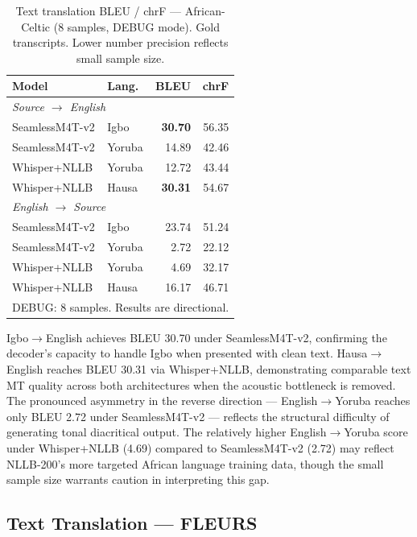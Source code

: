 \documentclass[10pt,twocolumn]{article}
\begin{document}
\begin{table}[H]
\centering
\caption{Text translation BLEU / chrF --- African-Celtic
(8 samples, DEBUG mode). Gold transcripts. Lower number precision reflects small sample size.}
\label{tab:ac_text}
\small
\setlength{\tabcolsep}{3pt}
\begin{tabular}{llrr}
\toprule
\textbf{Model} & \textbf{Lang.} & \textbf{BLEU} & \textbf{chrF} \\
\midrule
\multicolumn{4}{l}{\textit{Source $\rightarrow$ English}} \\
SeamlessM4T-v2 & Igbo   & \textbf{30.70} & 56.35 \\
SeamlessM4T-v2 & Yoruba & 14.89          & 42.46 \\
Whisper+NLLB   & Yoruba & 12.72          & 43.44 \\
Whisper+NLLB   & Hausa  & \textbf{30.31} & 54.67 \\
\midrule
\multicolumn{4}{l}{\textit{English $\rightarrow$ Source}} \\
SeamlessM4T-v2 & Igbo   & 23.74          & 51.24 \\
SeamlessM4T-v2 & Yoruba & 2.72           & 22.12 \\
Whisper+NLLB   & Yoruba & 4.69           & 32.17 \\
Whisper+NLLB   & Hausa  & 16.17          & 46.71 \\
\bottomrule
\multicolumn{4}{l}{\footnotesize DEBUG: 8 samples. Results are directional.}
\end{tabular}
\end{table}

Igbo$\rightarrow$English achieves BLEU 30.70 under SeamlessM4T-v2,
confirming the decoder's capacity to handle Igbo when presented
with clean text.
Hausa$\rightarrow$English reaches BLEU 30.31 via Whisper+NLLB,
demonstrating comparable text MT quality across both architectures
when the acoustic bottleneck is removed.
The pronounced asymmetry in the reverse direction ---
English$\rightarrow$Yoruba reaches only BLEU 2.72 under
SeamlessM4T-v2 --- reflects the structural difficulty of generating
tonal diacritical output.
The relatively higher English$\rightarrow$Yoruba score under
Whisper+NLLB (4.69) compared to SeamlessM4T-v2 (2.72) may reflect
NLLB-200's more targeted African language training data, though the
small sample size warrants caution in interpreting this gap.

\subsection{Text Translation --- FLEURS}
\end{document}
